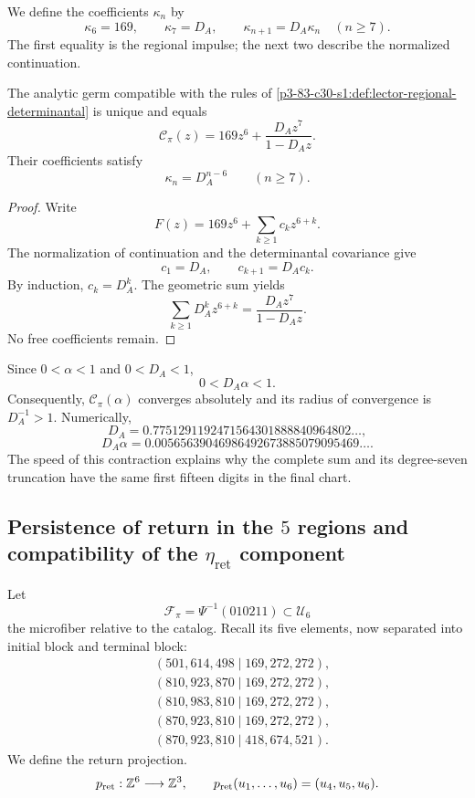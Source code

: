 We define the coefficients \(\kappa_n\) by
\[
\kappa_6=169,
\qquad
\kappa_7=D_A,
\qquad
\kappa_{n+1}=D_A\kappa_n\quad(n\ge7).
\]
The first equality is the regional impulse; the next two describe the normalized continuation.

\begin{theorem}
\label{p3-83-c30-s1:thm:realizacion-analitica-graduada}
The analytic germ compatible with the rules of
\cref{p3-83-c30-s1:def:lector-regional-determinantal} is unique and equals
\[
\boxed{
\mathscr C_\pi(z)
=169z^6+\frac{D_Az^7}{1-D_Az}.}
\]
Their coefficients satisfy
\[
\kappa_n=D_A^{n-6}\qquad(n\ge7).
\]
\end{theorem}

\begin{proof}
Write
\[
F(z)=169z^6+\sum_{k\ge1}c_kz^{6+k}.
\]
The normalization of continuation and the determinantal covariance give
\[
c_1=D_A,
\qquad
c_{k+1}=D_Ac_k.
\]
By induction, \(c_k=D_A^k\). The geometric sum yields
\[
\sum_{k\ge1}D_A^kz^{6+k}
=\frac{D_Az^7}{1-D_Az}.
\]
No free coefficients remain.
\end{proof}

Since \(0<\alpha<1\) and
\(0<D_A<1\),
\[
0<D_A\alpha<1.
\]
Consequently, \(\mathscr C_\pi(\alpha)\) converges absolutely and its
radius of convergence is \(D_A^{-1}>1\). Numerically,
\[
D_A=0.7751291192471564301888840964802\ldots,
\]
\[
D_A\alpha=0.00565639046986492673885079095469\ldots.
\]
The speed of this contraction explains why the complete sum and its
degree-seven truncation have the same first fifteen digits in the
final chart.

\subsection{Persistence of return in the
\texorpdfstring{\(5\)}{5}
regions and compatibility of the
\texorpdfstring{\(\eta_{\mathrm{ret}}\)}{eta_ret}
component}
\label{sec:s102:c38:2:5}


Let
\[
\mathcal F_\pi=\Psi^{-1}(010211)\subset\mathcal U_6
\]
the microfiber relative to the catalog. Recall its five elements, now
separated into initial block and terminal block:
\[
\begin{aligned}
 &(501,614,498\mid169,272,272),\\
 &(810,923,870\mid169,272,272),\\
 &(810,983,810\mid169,272,272),\\
 &(870,923,810\mid169,272,272),\\
 &(870,923,810\mid418,674,521).
\end{aligned}
\]
We define the return projection.
\[
p_{\rm ret}:\mathbb Z^6\longrightarrow\mathbb Z^3,
\qquad
p_{\rm ret}(u_1,\ldots,u_6)=(u_4,u_5,u_6).
\]

